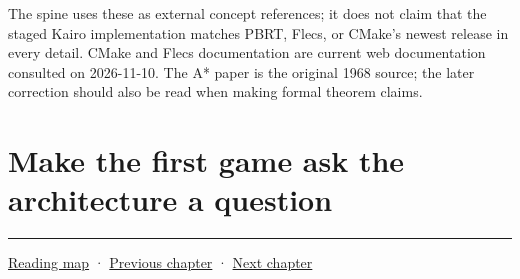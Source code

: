 The spine uses these as external concept references; it does not claim that the staged Kairo implementation matches PBRT, Flecs, or CMake's newest release in every detail. CMake and Flecs documentation are current web documentation consulted on 2026-11-10. The A* paper is the original 1968 source; the later correction should also be read when making formal theorem claims.

\section{Make the first game ask the architecture a question}\label{05-engine-i-ch008-make-the-first-game-ask-the-architecture-a-question}

\begin{center}\rule{0.5\linewidth}{0.5pt}\end{center}

\hyperref[volume-reading-map]{Reading map} · \hyperref[05-engine-i-ch007]{Previous chapter} · \hyperref[05-engine-i-ch009]{Next chapter}
